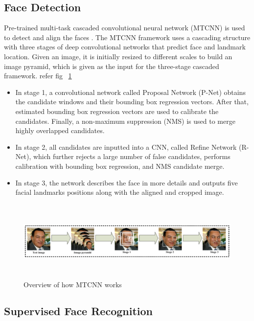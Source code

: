 \documentclass[a4paper,12pt, twoside]{NITKReport}
\begin{document}
\subsection{Face Detection}
Pre-trained  multi-task  cascaded  convolutional neural  network (MTCNN)  is used   to  detect  and  align  the  faces \cite{zhang2014jointly}. The MTCNN framework uses a cascading  structure  with  three  stages  of  deep  convolutional networks that predict face and landmark location. Given an image, it is initially resized to different scales to build an image pyramid, which is given as the input for the three-stage cascaded framework. refer fig ~\ref{mtcnn} 
\begin{itemize}
\item In stage 1, a convolutional network called Proposal Network (P-Net) obtains the candidate windows and their bounding box regression vectors. After that, estimated bounding box regression vectors are used to calibrate the candidates.  Finally, a non-maximum suppression  (NMS)  is  used  to  merge  highly  overlapped candidates.
\item In stage 2,  all candidates are inputted into a CNN, called Refine Network (R-Net), which further rejects a  large  number  of  false  candidates,  performs  calibration with bounding box regression, and NMS candidate merge.
\item In stage 3, the network describes the face in more details and outputs five facial landmarks positions along with the aligned and cropped image. 
\end{itemize}   
\begin{figure} [h]
\centering
    \includegraphics[height=4cm,width=15cm]{mtcnn.png}
    \caption{Overview of how MTCNN works}
    \label{mtcnn}
\end{figure}

\subsection{Supervised Face Recognition}
\end{document}
